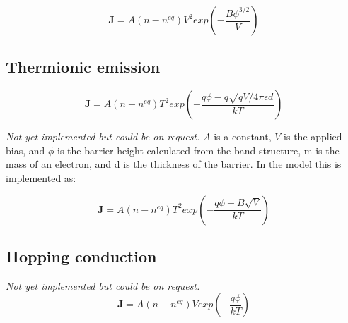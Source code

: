 \begin{equation}
\boldsymbol{J} = A(n-n^{eq}) V^2 exp  \left( -\frac{B \phi^{3/2}}{V}  \right)
\end{equation}

\subsection{Thermionic emission}
\begin{equation}
\boldsymbol{J} = A(n-n^{eq}) T^2 exp  \left( -\frac{q\phi -q\sqrt{qV/ 4 \pi \epsilon d}}{kT}  \right)
\end{equation}

\emph{Not yet implemented but could be on request.} $A$ is a constant, $V$ is the applied bias, and $\phi$ is the barrier height calculated from the band structure, m is the mass of an electron, and d is the thickness of the barrier.  In the model this is implemented as:

\begin{equation}
\boldsymbol{J} = A(n-n^{eq}) T^2 exp  \left( -\frac{q\phi -B\sqrt{V}}{kT}  \right)
\end{equation}

\subsection{Hopping conduction}
\emph{Not yet implemented but could be on request.}
\begin{equation}
\boldsymbol{J} = A(n-n^{eq}) V exp  \left( -\frac{q\phi}{kT}  \right)
\end{equation}
